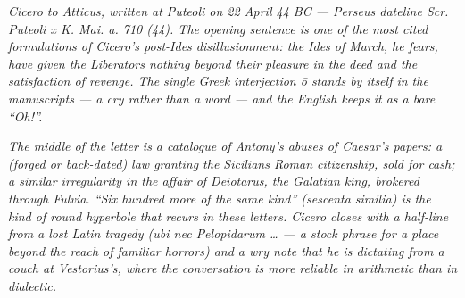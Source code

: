 
\textit{Cicero to Atticus, written at Puteoli on 22 April 44
BC --- Perseus dateline \textit{Scr. Puteoli x K. Mai. a. 710
(44)}. The opening sentence is one of the most cited
formulations of Cicero's post-Ides disillusionment: the Ides
of March, he fears, have given the Liberators nothing beyond
their pleasure in the deed and the satisfaction of revenge.
The single Greek interjection \textit{\=o} stands by itself in
the manuscripts --- a cry rather than a word --- and the
English keeps it as a bare ``Oh!''.}

\textit{The middle of the letter is a catalogue of Antony's
abuses of Caesar's papers: a (forged or back-dated) law
granting the Sicilians Roman citizenship, sold for cash; a
similar irregularity in the affair of Deiotarus, the Galatian
king, brokered through Fulvia. ``Six hundred more of the same
kind'' (\textit{sescenta similia}) is the kind of round
hyperbole that recurs in these letters. Cicero closes with a
half-line from a lost Latin tragedy (\textit{ubi nec Pelopidarum
\dots} --- a stock phrase for a place beyond the reach of
familiar horrors) and a wry note that he is dictating from a
couch at Vestorius's, where the conversation is more reliable
in arithmetic than in dialectic.}
